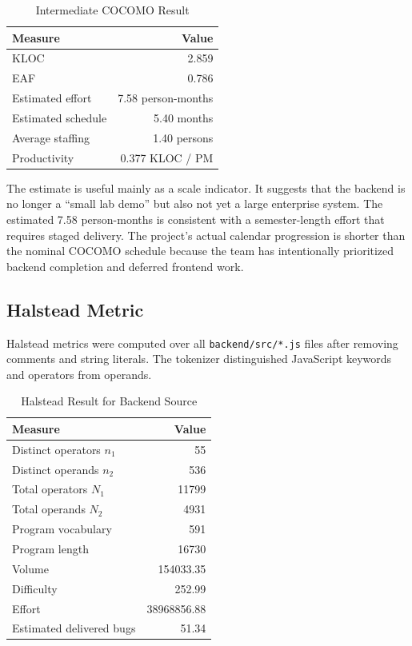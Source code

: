 \documentclass[conference]{IEEEtran}
\begin{document}
\begin{table}[htbp]
\caption{Intermediate COCOMO Result}
\centering
\footnotesize
\begin{tabular}{|l|r|}
\hline
\rowcolor{HeaderBlue}
\textbf{Measure} & \textbf{Value} \\
\hline
KLOC & 2.859 \\
EAF & 0.786 \\
Estimated effort & 7.58 person-months \\
Estimated schedule & 5.40 months \\
Average staffing & 1.40 persons \\
Productivity & 0.377 KLOC / PM \\
\hline
\end{tabular}
\label{tab:cocomo}
\end{table}

The estimate is useful mainly as a scale indicator. It suggests that the backend is no longer a ``small lab demo'' but also not yet a large enterprise system. The estimated 7.58 person-months is consistent with a semester-length effort that requires staged delivery. The project's actual calendar progression is shorter than the nominal COCOMO schedule because the team has intentionally prioritized backend completion and deferred frontend work.

\subsection{Halstead Metric}
Halstead metrics were computed over all \texttt{backend/src/*.js} files after removing comments and string literals. The tokenizer distinguished JavaScript keywords and operators from operands.

\begin{table}[htbp]
\caption{Halstead Result for Backend Source}
\centering
\footnotesize
\begin{tabular}{|l|r|}
\hline
\rowcolor{HeaderBlue}
\textbf{Measure} & \textbf{Value} \\
\hline
Distinct operators \(n_1\) & 55 \\
Distinct operands \(n_2\) & 536 \\
Total operators \(N_1\) & 11799 \\
Total operands \(N_2\) & 4931 \\
Program vocabulary & 591 \\
Program length & 16730 \\
Volume & 154033.35 \\
Difficulty & 252.99 \\
Effort & 38968856.88 \\
Estimated delivered bugs & 51.34 \\
\hline
\end{tabular}
\label{tab:halstead}
\end{table}
\end{document}
